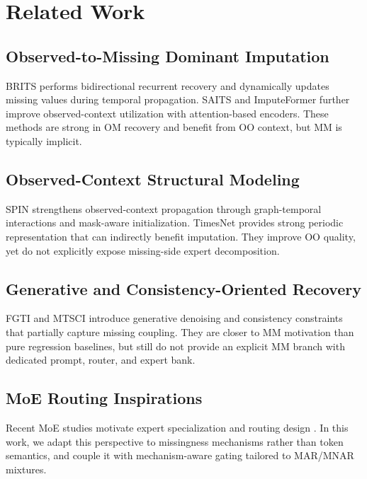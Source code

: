 \section{Related Work}

\subsection{Observed-to-Missing Dominant Imputation}
BRITS \cite{cao2018brits} performs bidirectional recurrent recovery and dynamically updates missing values during temporal propagation. SAITS \cite{du2023saits} and ImputeFormer \cite{liu2024imputeformer} further improve observed-context utilization with attention-based encoders. These methods are strong in OM recovery and benefit from OO context, but MM is typically implicit.

\subsection{Observed-Context Structural Modeling}
SPIN \cite{marisca2022spin} strengthens observed-context propagation through graph-temporal interactions and mask-aware initialization. TimesNet \cite{wu2023timesnet} provides strong periodic representation that can indirectly benefit imputation. They improve OO quality, yet do not explicitly expose missing-side expert decomposition.

\subsection{Generative and Consistency-Oriented Recovery}
FGTI \cite{chen2024fgti} and MTSCI \cite{liu2024mtsci} introduce generative denoising and consistency constraints that partially capture missing coupling. They are closer to MM motivation than pure regression baselines, but still do not provide an explicit MM branch with dedicated prompt, router, and expert bank.

\subsection{MoE Routing Inspirations}
Recent MoE studies motivate expert specialization and routing design \cite{puigcerver2024softmoe,shen2024mole,liu2024lingualsmoe,wang2025i2moe,zhou2025moex}. In this work, we adapt this perspective to missingness mechanisms rather than token semantics, and couple it with mechanism-aware gating tailored to MAR/MNAR mixtures.
